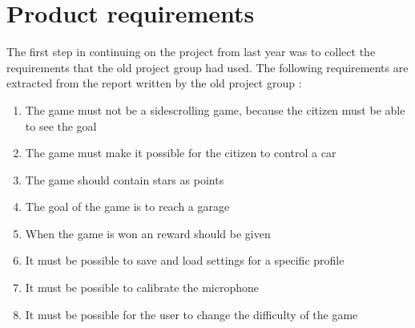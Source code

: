 \section{Product requirements}
\label{sprint1:requirements}

The first step in continuing on the project from last year was to collect the requirements that the old project group had used.
The following requirements are extracted from the report written by the old project group \citet*{oldcars}:

\begin{enumerate}
\item The game must not be a sidescrolling game, because the citizen must be able to see the goal
\item The game must make it possible for the citizen to control a car
\item The game should contain stars as points
\label{sprint1:requirements:points}
\item The goal of the game is to reach a garage
\item When the game is won an reward should be given
\item It must be possible to save and load settings for a specific profile
\item It must be possible to calibrate the microphone 
\item It must be possible for the user to change the difficulty of the game
\label{sprint1:requirements:difficulty}
\end{enumerate}